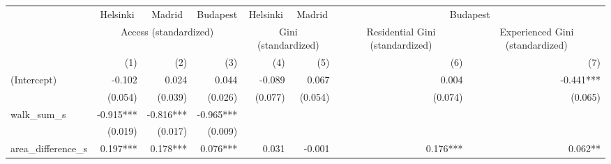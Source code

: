 \begin{tabular}{lrrrrrrr}
\toprule
                         & \multicolumn{1}{c}{Helsinki} & \multicolumn{1}{c}{Madrid} & \multicolumn{1}{c}{Budapest} & \multicolumn{1}{c}{Helsinki} & \multicolumn{1}{c}{Madrid} &                                        \multicolumn{2}{c}{Budapest}                                       \\ 
\cmidrule(lr){2-2} \cmidrule(lr){3-3} \cmidrule(lr){4-4} \cmidrule(lr){5-5} \cmidrule(lr){6-6} \cmidrule(lr){7-8} 
                         &                         \multicolumn{3}{c}{Access (standardized)}                        &          \multicolumn{2}{c}{Gini (standardized)}          & \multicolumn{1}{c}{Residential Gini (standardized)} & \multicolumn{1}{c}{Experienced Gini (standardized)} \\ 
\cmidrule(lr){2-4} \cmidrule(lr){5-6} \cmidrule(lr){7-7} \cmidrule(lr){8-8} 
                         &                          (1) &                        (2) &                          (3) &                          (4) &                        (5) &                                                 (6) &                                                 (7) \\ 
\midrule
(Intercept)              &                       -0.102 &                      0.024 &                        0.044 &                       -0.089 &                      0.067 &                                               0.004 &                                           -0.441*** \\ 
                         &                      (0.054) &                    (0.039) &                      (0.026) &                      (0.077) &                    (0.054) &                                             (0.074) &                                             (0.065) \\ 
walk\_sum\_s             &                    -0.915*** &                  -0.816*** &                    -0.965*** &                              &                            &                                                     &                                                     \\ 
                         &                      (0.019) &                    (0.017) &                      (0.009) &                              &                            &                                                     &                                                     \\ 
area\_difference\_s      &                     0.197*** &                   0.178*** &                     0.076*** &                        0.031 &                     -0.001 &                                            0.176*** &                                             0.062** \\ 

\end{tabular}
